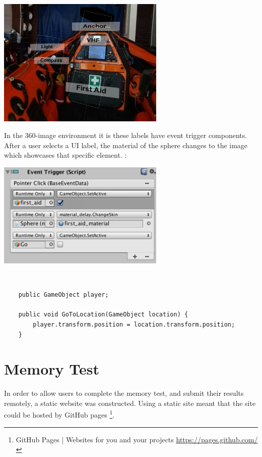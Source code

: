 \documentclass[a4paper, openright, twoside]{report}
\begin{document}
\begin{center}
\hfill \break
\includegraphics[width=0.6\textwidth]{images/360-labels}
\label{360-labels}
\hfill \break
\end{center}

In the 360-image environment it is these labels have event trigger components. After a user selects a UI label, the material of the sphere changes to the image which showcases that specific element. :

\begin{center}
\hfill \break
\includegraphics[width=0.6\textwidth]{images/360-event-component.png}
\label{360-labels}
\hfill \break
\end{center}

\\
\begin{lstlisting}
	public GameObject player;

	public void GoToLocation(GameObject location) {
		player.transform.position = location.transform.position;
	}
\end{lstlisting}





\section{Memory Test}
In order to allow users to complete the memory test, and submit their results remotely, a static website was constructed. Using a static site meant that the site could be hosted by GitHub pages \footnote{GitHub Pages | Websites for you and your projects \url{https://pages.github.com/}}. 
\end{document}
